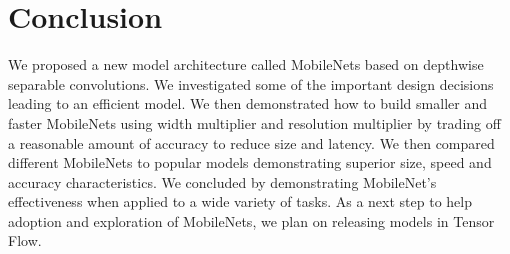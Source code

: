 \documentclass[10pt,twocolumn,letterpaper]{article}
\begin{document}
\begin{table}[t]
  \caption{MobileNet Distilled from FaceNet} \centering {}
\end{table}

\section{Conclusion} \label{sec:conclusion}

We proposed a new model architecture called MobileNets based on depthwise separable convolutions. We investigated some of the important design decisions leading to an efficient model. We then demonstrated how to build smaller and faster MobileNets using width multiplier and resolution multiplier by trading off a reasonable amount of accuracy to reduce size and latency. We then compared different MobileNets to popular models demonstrating superior size, speed and accuracy characteristics. We concluded by demonstrating MobileNet's effectiveness when applied to a wide variety of tasks. As a next step to help adoption and exploration of MobileNets, we plan on releasing models in Tensor Flow.

{\small


}
\end{document}

